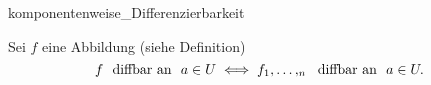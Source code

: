\documentclass[class=article, crop=false]{standalone}
\begin{document}
\begin{zettel}{komponentenweise_Differenzierbarkeit}
\begin{flashcard}[]{}
	\begin{lemma}
		Sei $f$ eine Abbildung (siehe Definition)
		\[
			f \tx{ diffbar an } a \in  U \iff f_1,\dots,_n \tx{ diffbar an  } a \in  U
		.\]
	\end{lemma}

\end{flashcard}
\end{zettel}
\end{document}
